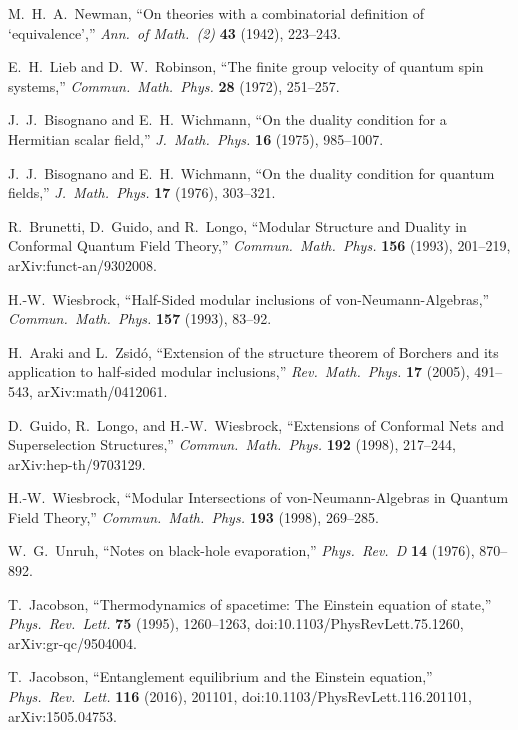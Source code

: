 M.~H.~A.~Newman,
``On theories with a combinatorial definition of `equivalence',''
\emph{Ann.\ of Math.\ (2)} \textbf{43} (1942), 223--243.

E.~H.~Lieb and D.~W.~Robinson,
``The finite group velocity of quantum spin systems,''
\emph{Commun.\ Math.\ Phys.} \textbf{28} (1972), 251--257.

J.~J.~Bisognano and E.~H.~Wichmann,
``On the duality condition for a Hermitian scalar field,''
\emph{J.\ Math.\ Phys.} \textbf{16} (1975), 985--1007.

J.~J.~Bisognano and E.~H.~Wichmann,
``On the duality condition for quantum fields,''
\emph{J.\ Math.\ Phys.} \textbf{17} (1976), 303--321.

R.~Brunetti, D.~Guido, and R.~Longo,
``Modular Structure and Duality in Conformal Quantum Field Theory,''
\emph{Commun.\ Math.\ Phys.} \textbf{156} (1993), 201--219,
arXiv:funct-an/9302008.

H.-W.~Wiesbrock,
``Half-Sided modular inclusions of von-Neumann-Algebras,''
\emph{Commun.\ Math.\ Phys.} \textbf{157} (1993), 83--92.

H.~Araki and L.~Zsid\'o,
``Extension of the structure theorem of Borchers and its application to half-sided modular inclusions,''
\emph{Rev.\ Math.\ Phys.} \textbf{17} (2005), 491--543,
arXiv:math/0412061.

D.~Guido, R.~Longo, and H.-W.~Wiesbrock,
``Extensions of Conformal Nets and Superselection Structures,''
\emph{Commun.\ Math.\ Phys.} \textbf{192} (1998), 217--244,
arXiv:hep-th/9703129.

H.-W.~Wiesbrock,
``Modular Intersections of von-Neumann-Algebras in Quantum Field Theory,''
\emph{Commun.\ Math.\ Phys.} \textbf{193} (1998), 269--285.

W.~G.~Unruh,
``Notes on black-hole evaporation,''
\emph{Phys.\ Rev.\ D} \textbf{14} (1976), 870--892.

T.~Jacobson,
``Thermodynamics of spacetime: The Einstein equation of state,''
\emph{Phys.\ Rev.\ Lett.} \textbf{75} (1995), 1260--1263,
doi:10.1103/PhysRevLett.75.1260,
arXiv:gr-qc/9504004.

T.~Jacobson,
``Entanglement equilibrium and the Einstein equation,''
\emph{Phys.\ Rev.\ Lett.} \textbf{116} (2016), 201101,
doi:10.1103/PhysRevLett.116.201101,
arXiv:1505.04753.

